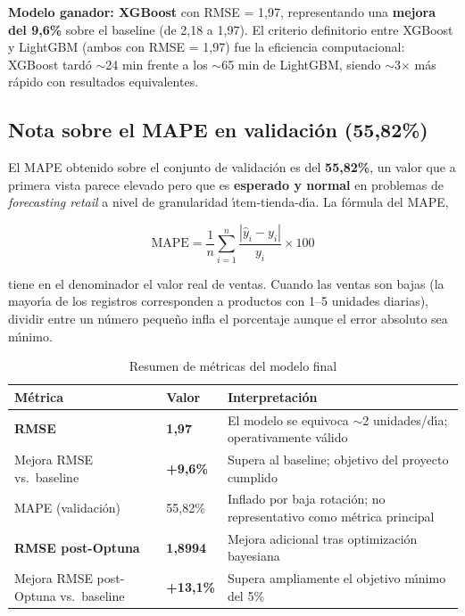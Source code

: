 \documentclass[12pt, a4paper, oneside]{report}
\newcommand{\kpi}[1]{\textbf{\color{accentorange}#1}}
\newcommand{\model}[1]{\textbf{\color{nucliolight}#1}}
\begin{document}
\textbf{Modelo ganador: \model{XGBoost}} con RMSE = 1,97, representando una \kpi{mejora del 9,6\%} sobre el baseline (de 2,18 a 1,97). El criterio definitorio entre XGBoost y LightGBM (ambos con RMSE = 1,97) fue la eficiencia computacional: XGBoost tard\'o $\sim$24 min frente a los $\sim$65 min de LightGBM, siendo $\sim$3$\times$ m\'as r\'apido con resultados equivalentes.

\subsection{Nota sobre el MAPE en validaci\'on (55,82\%)}

El MAPE obtenido sobre el conjunto de validaci\'on es del \textbf{55,82\%}, un valor que a primera vista parece elevado pero que es \textbf{esperado y normal} en problemas de \textit{forecasting retail} a nivel de granularidad \'{\i}tem-tienda-d\'{\i}a. La f\'ormula del MAPE,

\begin{equation}
  \text{MAPE} = \frac{1}{n} \sum_{i=1}^{n} \frac{|\hat{y}_i - y_i|}{y_i} \times 100
  \label{eq:mape}
\end{equation}

tiene en el denominador el valor real de ventas. Cuando las ventas son bajas (la mayor\'{\i}a de los registros corresponden a productos con 1--5 unidades diarias), dividir entre un n\'umero peque\~no infla el porcentaje aunque el error absoluto sea m\'{\i}nimo.

\begin{table}[H]
  \centering
  \caption{Resumen de m\'etricas del modelo final}
  \label{tab:metricas_final}
  \begin{tabularx}{0.88\textwidth}{L{4.5cm} C{2.5cm} X}
    \toprule
    {\color{white}\textbf{M\'etrica}} &
    {\color{white}\textbf{Valor}} &
    {\color{white}\textbf{Interpretaci\'on}} \\
    \midrule
       \textbf{RMSE}                   & \textbf{1,97} & El modelo se equivoca $\sim$2 unidades/d\'{\i}a; operativamente v\'alido \\
      Mejora RMSE vs.\ baseline        & \textbf{+9,6\%}  & Supera al baseline; objetivo del proyecto cumplido \\
       MAPE (validaci\'on)               & 55,82\% & Inflado por baja rotaci\'on; no representativo como m\'etrica principal \\
      \textbf{RMSE post-Optuna}        & \textbf{1,8994} & Mejora adicional tras optimizaci\'on bayesiana \\
       Mejora RMSE post-Optuna vs.\ baseline & \textbf{+13,1\%} & Supera ampliamente el objetivo m\'{\i}nimo del 5\% \\
    \bottomrule
  \end{tabularx}
\end{table}
\end{document}
